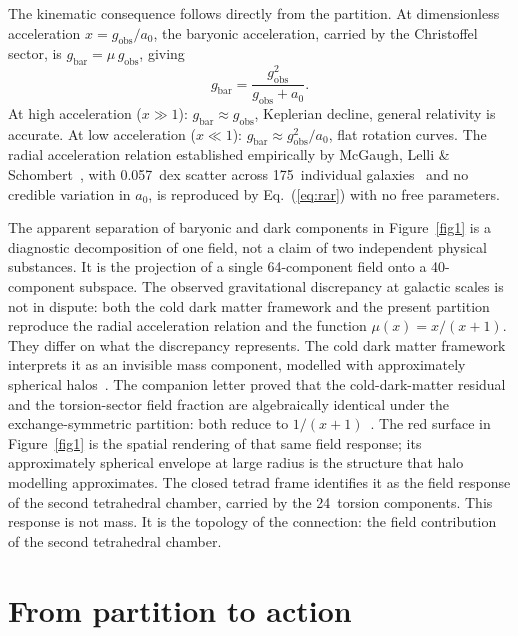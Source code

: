 \documentclass[twocolumn]{iopjournal}
\begin{document}
The kinematic consequence follows directly from the partition.
At dimensionless acceleration $x = g_{\mathrm{obs}}/a_0$, the
baryonic acceleration, carried by the Christoffel sector, is
$g_{\mathrm{bar}} = \mu\,g_{\mathrm{obs}}$, giving
\begin{equation}
  g_{\mathrm{bar}} =
  \frac{g_{\mathrm{obs}}^2}{g_{\mathrm{obs}} + a_0}.
  \label{eq:rar}
\end{equation}
At high acceleration ($x \gg 1$):
$g_{\mathrm{bar}} \approx g_{\mathrm{obs}}$, Keplerian
decline, general relativity is accurate.  At low acceleration
($x \ll 1$):
$g_{\mathrm{bar}} \approx g_{\mathrm{obs}}^2/a_0$, flat
rotation curves.  The radial acceleration relation established
empirically by McGaugh, Lelli \&
Schombert~\cite{McGaugh2016}, with 0.057~dex scatter across
175~individual galaxies~\cite{Li2018} and no credible
variation in $a_0$, is reproduced by Eq.~(\ref{eq:rar}) with
no free parameters.

The apparent separation of baryonic and dark components in
Figure~\ref{fig1} is a diagnostic decomposition of one field,
not a claim of two independent physical substances.  It is the
projection of a single 64-component field onto a 40-component
subspace.  The observed gravitational discrepancy at galactic
scales is not in dispute: both the cold dark matter framework
and the present partition reproduce the radial acceleration
relation and the function $\mu(x) = x/(x{+}1)$.  They differ
on what the discrepancy represents.  The cold dark matter
framework interprets it as an invisible mass component,
modelled with approximately spherical
halos~\cite{NFW1996}.  The companion letter proved that the
cold-dark-matter residual and the torsion-sector field
fraction are algebraically identical under the
exchange-symmetric partition: both reduce to
$1/(x{+}1)$~\cite{Nelson2026b}.  The red surface in
Figure~\ref{fig1} is the spatial rendering of that same field
response; its approximately spherical envelope at large
radius is the structure that halo modelling approximates.
The closed tetrad frame identifies it
as the field response of the second tetrahedral chamber,
carried by the 24~torsion components.  This response is not
mass.  It is the topology of the connection: the field
contribution of the second tetrahedral chamber.


\section{From partition to action}
\end{document}
